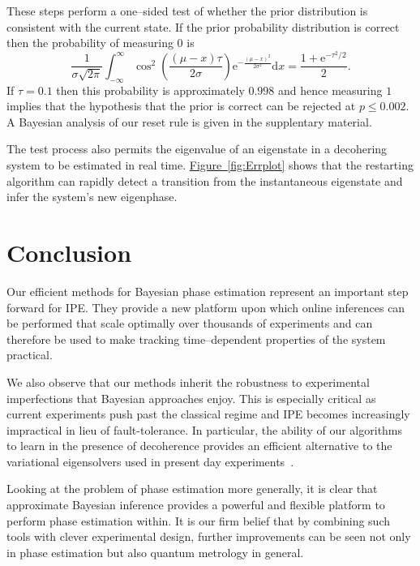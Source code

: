 \documentclass[aps,prl,amsmath,twocolumn,amssymb,superscriptaddress]{revtex4-1}
\newcommand{\app}[1]{the supplentary material}
\newcommand{\fig}[1]{\hyperref[fig:#1]{Figure~\ref*{fig:#1}}}
\newcommand{\ee}{\mathrm{e}}
\begin{document}
{These steps perform a one--sided test of whether the prior distribution is consistent with the current state.
If the prior probability distribution is correct then the probability of measuring $0$ is
\begin{equation}
    \frac{1}{\sigma\sqrt{2\pi}}\int_{-\infty}^\infty \cos^2\left(\frac{(\mu-x)\tau}{2\sigma}\right)\ee^{-\frac{(\mu-x)^2}{2\sigma^2}} \mathrm{d}x = \frac{1+\ee^{-\tau^2/2}}{2}.
\end{equation}
If $\tau=0.1$ then this probability is approximately $0.998$ and hence measuring $1$ implies that the hypothesis that the prior is correct can be rejected at $p \le 0.002$. A Bayesian analysis of our reset rule
is given in \app{bf}.


The test process also permits the eigenvalue of an eigenstate in a decohering system to be estimated in real time. \fig{Errplot} shows that the restarting algorithm can rapidly detect a transition from the instantaneous eigenstate and infer the system's new eigenphase.  

\section{Conclusion}


Our efficient methods for Bayesian phase estimation represent an important step forward for IPE.  They provide
a new platform upon which online inferences can be performed that scale optimally over
thousands of experiments and can therefore be used to make tracking time--dependent properties of the system
practical.  

We also observe that our methods inherit the robustness to experimental imperfections that
Bayesian approaches enjoy.
This is especially critical as current experiments push past the classical
regime and IPE becomes increasingly impractical in lieu of fault-tolerance.
In particular, the ability of our algorithms to learn in the presence of decoherence provides an efficient alternative to the
variational eigensolvers used in present day experiments~\cite{PMS+14,MBL+14,WHT15}.  

Looking at the problem of phase estimation more generally, it is clear that approximate Bayesian inference
provides a powerful and flexible platform to perform phase estimation within.
It is our firm belief that by combining such tools with clever experimental design,
further improvements can be seen not only in phase estimation but also quantum metrology in general.

}
\end{document}
